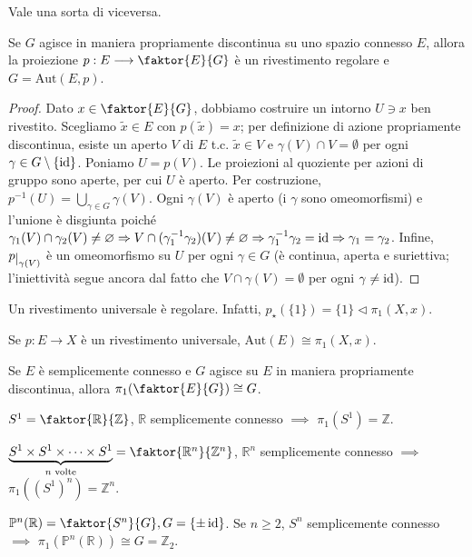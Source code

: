 Vale una sorta di viceversa.

\begin{prop}
  Se $G$ agisce in maniera propriamente discontinua su uno spazio connesso $E$, allora la proiezione $p:E \longrightarrow \faktor{E}{G}$ è un rivestimento regolare e $G=\text{Aut}(E, p)$.
\end{prop}

\begin{proof}
  Dato $x \in \faktor{E}{G}$, dobbiamo costruire un intorno $U \ni x$ ben rivestito. Scegliamo $\tilde{x} \in E$ con $p(\tilde{x})=x$; per definizione di azione propriamente discontinua, esiste un aperto $V$ di $E$ t.c. $\tilde{x} \in V$ e $\gamma(V)\cap V=\emptyset$ per ogni $\gamma \in G\setminus\{\operatorname{id}\}$. Poniamo $U=p(V)$. Le proiezioni al quoziente per azioni di gruppo sono aperte, per cui $U$ è aperto.
  Per costruzione, $\displaystyle p^{-1}(U)=\bigcup_{\gamma \in G} \gamma(V)$.
  Ogni $\gamma(V)$ è aperto (i $\gamma$ sono omeomorfismi) e l'unione è disgiunta poiché $\gamma_1(V) \cap \gamma_2(V) \not=\varnothing \Rightarrow V \cap (\gamma_1^{-1}\gamma_2)(V) \not=\varnothing \Rightarrow \gamma_1^{-1}\gamma_2=\operatorname{id} \Rightarrow \gamma_1=\gamma_2$.
  Infine, $p\restrict{\gamma(V)}$ è un omeomorfismo su $U$ per ogni $\gamma \in G$ (è continua, aperta e suriettiva; l'iniettività segue ancora dal fatto che $V \cap \gamma(V)=\emptyset$ per ogni $\gamma\not=\operatorname{id}$).
\end{proof}

\begin{oss}
  Un rivestimento universale è regolare. Infatti, $p_{\star}(\{1\})=\{1\} \vartriangleleft \pi_1(X, x)$.
\end{oss}

\begin{cor}
  Se $p:E \longrightarrow X$ è un rivestimento universale, $\text{Aut}(E)\cong\pi_1(X, x)$.
\end{cor}

\begin{cor}
  Se $E$ è semplicemente connesso e $G$ agisce su $E$ in maniera propriamente discontinua, allora $\pi_1(\faktor{E}{G}) \cong G$.
\end{cor}

\begin{ex}
  \begin{nlist}
    \item $S^1=\faktor{\mathbb{R}}{\mathbb{Z}}$, $\mathbb{R}$ semplicemente connesso $\implies$ $\pi_1(S^1)=\mathbb{Z}$.
    \item $\underbrace{S^1 \times S^1 \times \dots \times S^1}_{n \text{ volte}}=\faktor{\mathbb{R}^n}{\mathbb{Z}^n}$, $\mathbb{R}^n$ semplicemente connesso $\implies$ $\pi_1((S^1)^n)=\mathbb{Z}^n$.
    \item $\mathbb{P}^n(\mathbb{R})=\faktor{S^n}{G}, G=\{\pm\id\}$. Se $n \ge 2$, $S^n$ semplicemente connesso $\implies$ $\pi_1(\mathbb{P}^n(\mathbb{R})) \cong G=\mathbb{Z}_2$.
  \end{nlist}
\end{ex}
